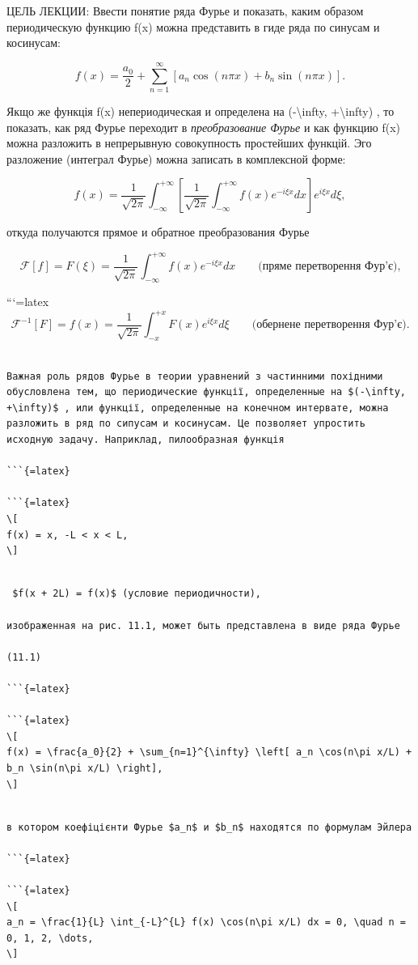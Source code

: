 \documentclass[
]{article}
\begin{document}
ЦЕЛЬ ЛЕКЦИИ: Ввести понятие ряда Фурье и показать, каким образом
периодическую функцию f(x) можна представить в гиде ряда по синусам и
косинусам:

\[
f(x) = \frac{a_0}{2} + \sum_{n=1}^{\infty} [a_n \cos(n\pi x) + b_n \sin(n\pi x)].
\]

Якщо же функція f(x) непериодическая и определена на
(-\textbackslash infty, +\textbackslash infty) , то показать, как ряд
Фурье переходит в \emph{преобразование Фурье} и как функцию f(x) можна
разложить в непрерывную совокупность простейших функцій. Эго разложение
(интеграл Фурье) можна записать в комплексной форме:

\[
f(x) = \frac{1}{\sqrt{2\pi}} \int_{-\infty}^{+\infty} \left[ \frac{1}{\sqrt{2\pi}} \int_{-\infty}^{+\infty} f(x) e^{-i\xi x} dx \right] e^{i\xi x} d\xi,
\]

откуда получаются прямое и обратное преобразования Фурье

\[
\mathcal{F}[f] = F(\xi) = \frac{1}{\sqrt{2\pi}} \int_{-\infty}^{+\infty} f(x) e^{-i\xi x} dx \qquad \text{(пряме перетворення Фур'є),}
\]

```{=latex}
\[
\mathcal{F}^{-1}[F] = f(x) = \frac{1}{\sqrt{2\pi}} \int_{-x}^{+x} F(x) e^{i\xi x} d\xi \qquad \text{(обернене перетворення Фур'є)}.
\]

\begin{verbatim}

Важная роль рядов Фурье в теории уравнений з частинними похідними обусловлена тем, що периодические функції, определенные на $(-\infty, +\infty)$ , или функції, определенные на конечном интервате, можна разложить в ряд по сипусам и косинусам. Це позволяет упростить исходную задачу. Наприклад, пилообразная функція

```{=latex}

```{=latex}
\[
f(x) = x, -L < x < L,
\]
\end{verbatim}

\begin{verbatim}

 $f(x + 2L) = f(x)$ (условие периодичности),

изображенная на рис. 11.1, может быть представлена в виде ряда Фурье

(11.1)

```{=latex}

```{=latex}
\[
f(x) = \frac{a_0}{2} + \sum_{n=1}^{\infty} \left[ a_n \cos(n\pi x/L) + b_n \sin(n\pi x/L) \right],
\]
\end{verbatim}

\begin{verbatim}

в котором коефіцієнти Фурье $a_n$ и $b_n$ находятся по формулам Эйлера

```{=latex}

```{=latex}
\[
a_n = \frac{1}{L} \int_{-L}^{L} f(x) \cos(n\pi x/L) dx = 0, \quad n = 0, 1, 2, \dots,
\]
\end{verbatim}
\end{document}
